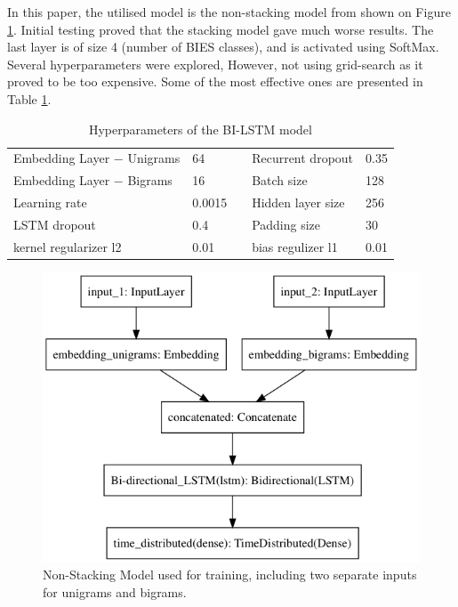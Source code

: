 \documentclass[12pt,a4paper]{article}
\begin{document}
In this paper, the utilised model is the non-stacking model from \cite{paper} shown on Figure \ref{img:model}. Initial testing proved that the stacking model gave much worse results. The last layer is of size 4 (number of BIES classes), and is activated using SoftMax. Several hyperparameters were explored, However, not using grid-search as it proved to be too expensive.
Some of the most effective ones are presented in Table \ref{table:hyper}.

\begin{table}[]
\centering
\caption{Hyperparameters of the BI-LSTM model}
\label{table:hyper}
\begin{tabular}{|l|l|l|l|l|}
\cline{1-2} \cline{4-5}
Embedding Layer $-$ Unigrams & 64     &  & Recurrent dropout & 0.35 \\ \cline{1-2} \cline{4-5} 
Embedding Layer $-$ Bigrams  & 16     &  & Batch size        & 128  \\ \cline{1-2} \cline{4-5} 
Learning rate                & 0.0015 &  & Hidden layer size & 256  \\ \cline{1-2} \cline{4-5} 
LSTM dropout                 & 0.4    &  & Padding size      & 30   \\ \cline{1-2} \cline{4-5} 
kernel regularizer l2        & 0.01   &  & bias regulizer l1 & 0.01 \\ \cline{1-2} \cline{4-5} 
\end{tabular}
\end{table}

\begin{figure}[H]

\begin{center}
\includegraphics[width=0.7\columnwidth, angle = 0]{img/model.png}
\end{center}
\caption{Non-Stacking Model used for training, including two separate inputs for unigrams and bigrams.}
\label{img:model}
\end{figure}
\end{document}
